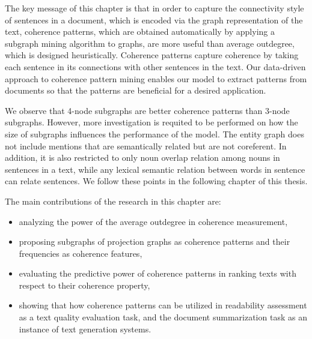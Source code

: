 The key message of this chapter is that in order to capture the connectivity style of sentences in  a document, which is encoded via the graph representation of the text, coherence patterns, which are obtained automatically by applying a subgraph mining algorithm to graphs, are more useful than average outdegree, which is designed heuristically. 
Coherence patterns capture coherence by taking each sentence in its connections with other sentences in the text. 
Our \mbox{data-driven} approach to coherence pattern mining enables our model to extract patterns from documents so that the patterns are beneficial for a desired application. 

We observe that 4-node subgraphs are better coherence patterns than 3-node subgraphs. 
However, more investigation is requited to be performed on how the size of subgraphs influences the performance of the model. 
The entity graph does not include mentions that are semantically related but are not coreferent. 
In addition, it is also restricted to only noun overlap relation among nouns in sentences in a text, while any lexical semantic relation between words in sentence can relate sentences. 
We follow these points in the following chapter of this thesis. 

The main contributions of the research in this chapter are:

\begin{itemize}
\item analyzing the power of the average outdegree in coherence measurement,
\item proposing subgraphs of projection graphs as coherence patterns and their frequencies as coherence features,
\item evaluating the predictive power of coherence patterns in ranking texts with respect to their coherence property,
\item showing that how coherence patterns can be utilized in readability assessment as a text quality evaluation task, and the document summarization task as an instance of text generation systems.   
\end{itemize}


